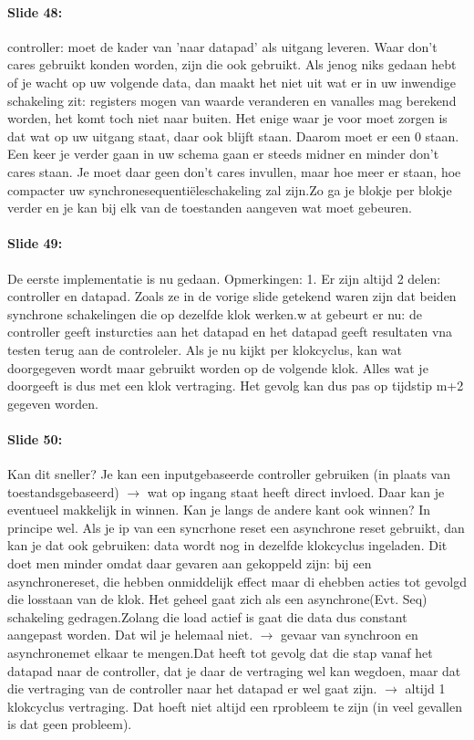 \documentclass[10pt,a4paper]{book}
\begin{document}
\paragraph{Slide 48:} controller: moet de kader van 'naar datapad' als uitgang leveren. Waar don't cares gebruikt konden worden, zijn die ook gebruikt. Als jenog niks gedaan hebt of je wacht op uw volgende data, dan maakt het niet uit wat er in uw inwendige schakeling zit: registers mogen van waarde veranderen en vanalles mag berekend worden, het komt toch niet naar buiten. Het enige waar je voor moet zorgen is dat wat op uw uitgang staat, daar ook blijft staan. Daarom moet er een 0 staan. Een keer je verder gaan in uw schema gaan er steeds midner en minder don't cares staan. Je moet daar geen don't cares invullen, maar hoe meer er staan, hoe compacter uw synchronesequenti\"eleschakeling zal zijn.Zo ga je blokje per blokje verder en je kan bij elk van de toestanden aangeven wat moet gebeuren. 

\paragraph{Slide 49:} De eerste implementatie is nu gedaan. Opmerkingen: 	1. Er zijn altijd 2 delen: controller en datapad. Zoals ze in de vorige slide getekend waren zijn dat beiden synchrone schakelingen die op dezelfde klok werken.w at gebeurt er nu: de controller geeft insturcties aan het datapad en het datapad geeft resultaten vna testen terug aan de controleler. Als je nu kijkt per klokcyclus, kan wat doorgegeven wordt maar gebruikt worden op de volgende klok. Alles wat je doorgeeft is dus met een klok vertraging. Het gevolg kan dus pas op tijdstip m+2 gegeven worden.

\paragraph{Slide 50:} Kan dit sneller? Je kan een inputgebaseerde controller gebruiken (in plaats van toestandsgebaseerd) $\rightarrow$ wat op ingang staat heeft direct invloed. Daar kan je eventueel makkelijk in winnen. Kan je langs de andere kant ook winnen? In principe wel. Als je ip van een syncrhone reset een asynchrone reset gebruikt, dan kan je dat ook gebruiken: data wordt nog in dezelfde klokcyclus ingeladen. Dit doet men minder omdat daar gevaren aan gekoppeld zijn: bij een asynchronereset, die hebben onmiddelijk effect maar di ehebben acties tot gevolgd die losstaan van de klok. Het geheel gaat zich als een asynchrone(Evt. Seq) schakeling gedragen.Zolang die load actief is gaat die data dus constant aangepast worden. Dat wil je helemaal niet. $\rightarrow$ gevaar van synchroon en asynchronemet elkaar te mengen.Dat heeft tot gevolg dat die stap vanaf het datapad naar de controller, dat je daar de vertraging wel kan wegdoen, maar dat die vertraging van de controller naar het datapad er wel gaat zijn. $\rightarrow$ altijd 1 klokcyclus vertraging. Dat hoeft niet altijd een rprobleem te zijn (in veel gevallen is dat geen probleem).
\end{document}
